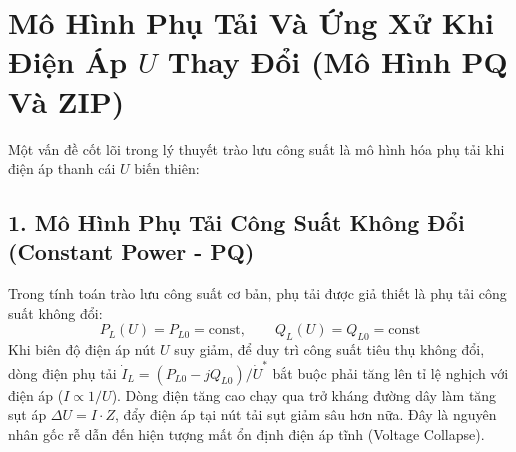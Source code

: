 \documentclass[12pt,a4paper,oneside]{report}
\begin{document}
\section{Mô Hình Phụ Tải Và Ứng Xử Khi Điện Áp $U$ Thay Đổi (Mô Hình PQ Và ZIP)}
Một vấn đề cốt lõi trong lý thuyết trào lưu công suất là mô hình hóa phụ tải khi điện áp thanh cái $U$ biến thiên:

\subsection{1. Mô Hình Phụ Tải Công Suất Không Đổi (Constant Power - PQ)}
Trong tính toán trào lưu công suất cơ bản, phụ tải được giả thiết là phụ tải công suất không đổi:
\begin{equation}
P_L(U) = P_{L0} = \text{const}, \qquad Q_L(U) = Q_{L0} = \text{const}
\end{equation}
Khi biên độ điện áp nút $U$ suy giảm, để duy trì công suất tiêu thụ không đổi, dòng điện phụ tải $\dot{I}_L = (P_{L0} - jQ_{L0})/\dot{U}^*$ bắt buộc phải tăng lên tỉ lệ nghịch với điện áp ($I \propto 1/U$). Dòng điện tăng cao chạy qua trở kháng đường dây làm tăng sụt áp $\Delta U = I \cdot Z$, đẩy điện áp tại nút tải sụt giảm sâu hơn nữa. Đây là nguyên nhân gốc rễ dẫn đến hiện tượng mất ổn định điện áp tĩnh (Voltage Collapse).
\end{document}
